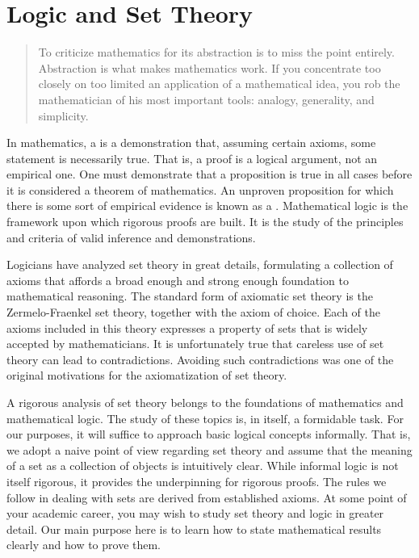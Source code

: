 \chapter{Logic and Set Theory}


\begin{quote}
To criticize mathematics for its abstraction is to miss the point entirely.
Abstraction is what makes mathematics work.
If you concentrate too closely on too limited an application of a mathematical idea, you rob the mathematician of his most important tools: analogy, generality, and simplicity.
\end{quote}


In mathematics, a  is a demonstration that, assuming certain axioms, some statement is necessarily true.
That is, a proof is a logical argument, not an empirical one.
One must demonstrate that a proposition is true in all cases before it is considered a theorem of mathematics.
An unproven proposition for which there is some sort of empirical evidence is known as a .
Mathematical logic is the framework upon which rigorous proofs are built.
It is the study of the principles and criteria of valid inference and demonstrations.

Logicians have analyzed set theory in great details, formulating a collection of axioms that affords a broad enough and strong enough foundation to mathematical reasoning.
The standard form of axiomatic set theory is the Zermelo-Fraenkel set theory, together with the axiom of choice.
Each of the axioms included in this theory expresses a property of sets that is widely accepted by mathematicians.
It is unfortunately true that careless use of set theory can lead to contradictions.
Avoiding such contradictions was one of the original motivations for the axiomatization of set theory.

A rigorous analysis of set theory belongs to the foundations of mathematics and mathematical logic.
The study of these topics is, in itself, a formidable task.
For our purposes, it will suffice to approach basic logical concepts informally.
That is, we adopt a naive point of view regarding set theory and assume that the meaning of a set as a collection of objects is intuitively clear.
While informal logic is not itself rigorous, it provides the underpinning for rigorous proofs.
The rules we follow in dealing with sets are derived from established axioms.
At some point of your academic career, you may wish to study set theory and logic in greater detail.
Our main purpose here is to learn how to state mathematical results clearly and how to prove them.


